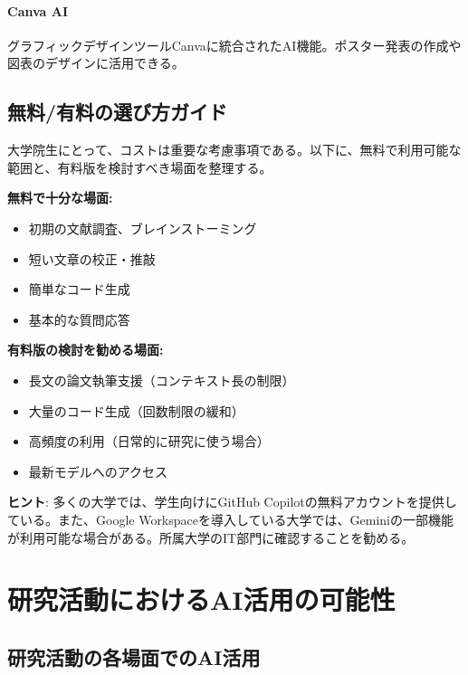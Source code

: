 \paragraph{Canva AI}
グラフィックデザインツールCanvaに統合されたAI機能。ポスター発表の作成や図表のデザインに活用できる。

\subsection{無料/有料の選び方ガイド}

大学院生にとって、コストは重要な考慮事項である。以下に、無料で利用可能な範囲と、有料版を検討すべき場面を整理する。

\textbf{無料で十分な場面:}
\begin{itemize}
\item 初期の文献調査、ブレインストーミング
\item 短い文章の校正・推敲
\item 簡単なコード生成
\item 基本的な質問応答
\end{itemize}

\textbf{有料版の検討を勧める場面:}
\begin{itemize}
\item 長文の論文執筆支援（コンテキスト長の制限）
\item 大量のコード生成（回数制限の緩和）
\item 高頻度の利用（日常的に研究に使う場合）
\item 最新モデルへのアクセス
\end{itemize}

\begin{screen}
\textbf{ヒント}: 多くの大学では、学生向けにGitHub Copilotの無料アカウントを提供している。また、Google Workspaceを導入している大学では、Geminiの一部機能が利用可能な場合がある。所属大学のIT部門に確認することを勧める。
\end{screen}

\section{研究活動におけるAI活用の可能性}
\label{sec:1.3}

\subsection{研究活動の各場面でのAI活用}


